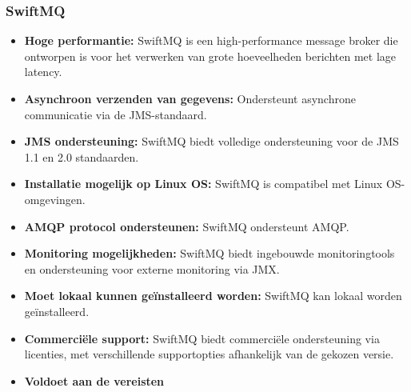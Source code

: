 \subsubsection{SwiftMQ}
\begin{itemize}
    \item \textbf{Hoge performantie:} SwiftMQ is een high-performance message broker die ontworpen is voor het verwerken van grote hoeveelheden berichten met lage latency.
    \item \textbf{Asynchroon verzenden van gegevens:} Ondersteunt asynchrone communicatie via de JMS-standaard.
    \item \textbf{JMS ondersteuning:} SwiftMQ biedt volledige ondersteuning voor de JMS 1.1 en 2.0 standaarden.
    \item \textbf{Installatie mogelijk op Linux OS:} SwiftMQ is compatibel met Linux OS-omgevingen.
    \item \textbf{AMQP protocol ondersteunen:} SwiftMQ ondersteunt AMQP.
    \item \textbf{Monitoring mogelijkheden:} SwiftMQ biedt ingebouwde monitoringtools en ondersteuning voor externe monitoring via JMX.
    \item \textbf{Moet lokaal kunnen geïnstalleerd worden:} SwiftMQ kan lokaal worden geïnstalleerd.
    \item \textbf{Commerciële support:} SwiftMQ biedt commerciële ondersteuning via licenties, met verschillende supportopties afhankelijk van de gekozen versie.
    \item \textbf{Voldoet aan de vereisten}
\end{itemize}



